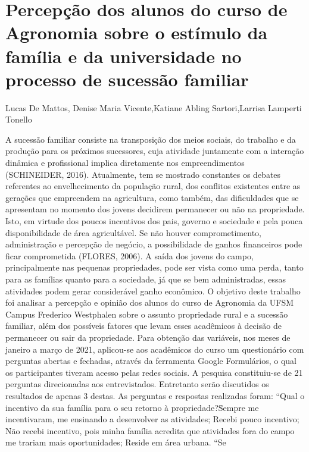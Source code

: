 

\section{Percepção dos alunos do curso de Agronomia sobre o estímulo da família e da universidade no processo de sucessão familiar}

Lucas De Mattos, Denise Maria Vicente,Katiane Abling Sartori,Larrisa Lamperti Tonello

A sucessão familiar consiste na transposição dos meios sociais, do trabalho e da produção 
para os próximos sucessores, cuja atividade juntamente com a interação dinâmica e profissional 
implica diretamente nos empreendimentos (SCHINEIDER, 2016). Atualmente, tem se mostrado 
constantes os debates referentes ao envelhecimento da população rural, dos conflitos existentes 
entre as gerações que empreendem na agricultura, como também, das dificuldades que se 
apresentam no momento dos jovens decidirem permanecer ou não na propriedade. Isto, em virtude 
dos poucos incentivos dos pais, governo e sociedade e pela pouca disponibilidade de área 
agricultável. Se não houver comprometimento, administração e percepção de negócio, a 
possibilidade de ganhos financeiros pode ficar comprometida (FLORES, 2006). A saída dos jovens 
do campo, principalmente nas pequenas propriedades, pode ser vista como uma perda, tanto para 
as famílias quanto para a sociedade, já que se bem administradas, essas atividades podem gerar 
considerável ganho econômico. 
O objetivo deste trabalho foi analisar a percepção e opinião dos alunos do curso de 
Agronomia da UFSM Campus Frederico Westphalen sobre o assunto propriedade rural e a 
sucessão familiar, além dos possíveis fatores que levam esses acadêmicos à decisão de permanecer 
ou sair da propriedade. Para obtenção das variáveis, nos meses de janeiro a março de 2021, aplicou-se aos acadêmicos do curso um questionário com perguntas abertas e fechadas, através da 
ferramenta Google Formulários, o qual os participantes tiveram acesso pelas redes sociais. A 
pesquisa constituiu-se de 21 perguntas direcionadas aos entrevistados. Entretanto serão discutidos 
os resultados de apenas 3 destas. As perguntas e respostas realizadas foram: “Qual o incentivo da 
sua família para o seu retorno à propriedade?\"Sempre me incentivaram, me ensinando a 
desenvolver as atividades; Recebi pouco incentivo; Não recebi incentivo, pois minha família 
acredita que atividades fora do campo me trariam mais oportunidades; Reside em área urbana. “Se 
